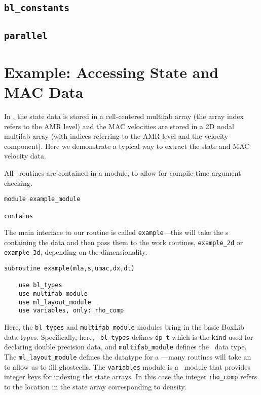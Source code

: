 \subsection{{\tt bl\_constants}}

\subsection{{\tt parallel}}

\section{\label{sec:example} Example: Accessing State and MAC Data}

In \maestro, the state data is stored in a cell-centered multifab array
(the array index refers to the AMR level) and the MAC velocities are
stored in a 2D nodal multifab array (with indices referring to the AMR
level and the velocity component).  Here we demonstrate a typical way
to extract the state and MAC velocity data.

All \maestro\ routines are contained in a module, to allow for compile-time
argument checking.
\begin{lstlisting}[language={[95]fortran},mathescape=false]
module example_module

contains
\end{lstlisting}

The main interface to our routine is called {\tt example}---this will
take the \multifab s containing the data and then pass them to the
work routines, {\tt example\_2d} or {\tt example\_3d}, depending on
the dimensionality.  
\begin{lstlisting}[language={[95]fortran},mathescape=false]
  subroutine example(mla,s,umac,dx,dt)

    use bl_types
    use multifab_module
    use ml_layout_module
    use variables, only: rho_comp
\end{lstlisting}

\noindent Here, the {\tt bl\_types} and {\tt multifab\_module} modules
bring in the basic BoxLib data types. Specifically, here, {\tt
  bl\_types} defines {\tt dp\_t} which is the {\tt kind} used for
declaring double precision data, and {\tt multifab\_module} defines
the \multifab\ data type.  The {\tt ml\_layout\_module} defines the
datatype for a \mllayout---many routines will take an \mllayout
to allow us to fill ghostcells.  The {\tt variables} module is a \maestro\
module that provides integer keys for indexing the state arrays.  In
this case the integer {\tt rho\_comp} refers to the location in the
state array corresponding to density.

